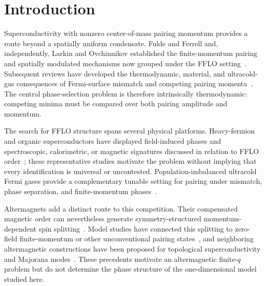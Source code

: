\section{Introduction}
Superconductivity with nonzero center-of-mass pairing momentum provides a route beyond a spatially uniform condensate. Fulde and Ferrell and, independently, Larkin and Ovchinnikov established the finite-momentum pairing and spatially modulated mechanisms now grouped under the FFLO setting~\cite{FuldeFerrell1964,LarkinOvchinnikov1965}. Subsequent reviews have developed the thermodynamic, material, and ultracold-gas consequences of Fermi-surface mismatch and competing pairing momenta~\cite{CasalbuoniNardulli2004,MatsudaShimahara2007,KinnunenEtAl2018}. The central phase-selection problem is therefore intrinsically thermodynamic: competing minima must be compared over both pairing amplitude and momentum.

\LayoutAudit
The search for FFLO structure spans several physical platforms. Heavy-fermion and organic superconductors have displayed field-induced phases and spectroscopic, calorimetric, or magnetic signatures discussed in relation to FFLO order~\cite{RadovanEtAl2003,BianchiEtAl2003,KenzelmannEtAl2008,LortzEtAl2007,MayaffreEtAl2014}; these representative studies motivate the problem without implying that every identification is universal or uncontested. Population-imbalanced ultracold Fermi gases provide a complementary tunable setting for pairing under mismatch, phase separation, and finite-momentum phases~\cite{LiaoEtAl2010,ZwierleinEtAl2006,PartridgeEtAl2006,SheehyRadzihovsky2007,RadzihovskySheehy2010}.

Altermagnets add a distinct route to this competition. Their compensated magnetic order can nevertheless generate symmetry-structured momentum-dependent spin splitting~\cite{SmejkalSinovaJungwirth2022,SmejkalEtAl2022,Mazin2022,SmejkalEtAl2020}. Model studies have connected this splitting to zero-field finite-momentum or other unconventional pairing states~\cite{ChakrabortyBlackSchaffer2024,HongParkKim2025,BoseVadnaisParamekanti2024}, and neighboring altermagnetic constructions have been proposed for topological superconductivity and Majorana modes~\cite{ZhuEtAl2023,GhorashiHughesCano2024}. These precedents motivate an altermagnetic finite-$q$ problem but do not determine the phase structure of the one-dimensional model studied here.

